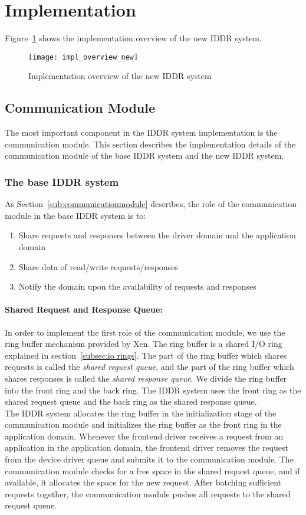 \section{Implementation}

Figure~\ref{fig:Implementation overview} shows the implementation overview of the new IDDR system.

\begin{figure}[!ht]
\centering
\texttt{[image: impl\_overview\_new]}
\caption{Implementation overview of the new IDDR system}
\label{fig:Implementation overview}
\end{figure}

\subsection{Communication Module}
The most important component in the IDDR system implementation is the communication module. This section describes the implementation details of the communication module of the base IDDR system and the new IDDR system. 
\subsubsection*{The base IDDR system}
As Section~\ref{sub:communicationmodule} describes, the role of the communication module in the base IDDR system is to:
\begin{enumerate} 
\item Share requests and responses between the driver domain and the application domain
\item Share data of read/write requests/responses
\item Notify the domain upon the availability of requests and responses 
\end{enumerate}
\paragraph{Shared Request and Response Queue:}
In order to implement the first role of the communication module, we use the ring buffer mechanism provided by Xen. The ring buffer is a shared I/O ring explained in section~\ref{subsec:io rings}. The part of the ring buffer which shares requests is called the \textit{shared request queue}, and the part of the ring buffer which shares responses is called the \textit{shared response queue}. We divide the ring buffer into the front ring and the back ring. The IDDR system uses the front ring as the shared request queue and the back ring as the shared response queue. 
\\[3mm]
The IDDR system allocates the ring buffer in the initialization stage of the communication module and initializes the ring buffer as the front ring in the application domain. Whenever the frontend driver receives a request from an application in the application domain, the frontend driver removes the request from the device driver queue and submits it to the communication module. The communication module checks for a free space in the shared request queue, and if available, it allocates the space for the new request. After batching sufficient requests together, the communication module pushes all requests to the shared request queue.

